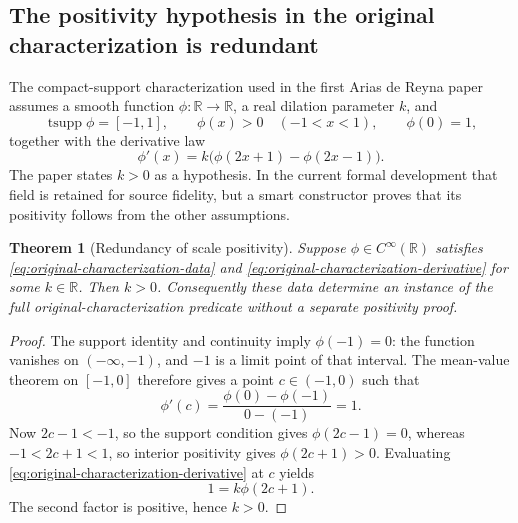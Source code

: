 \documentclass[11pt,oneside]{article}
\newtheorem{theorem}{Theorem}[section]
\theoremstyle{definition}
\theoremstyle{remark}
\newcommand{\R}{\mathbb R}
\begin{document}
\subsection{The positivity hypothesis in the original characterization is redundant}
\label{sec:scale-positive}

The compact-support characterization used in the first Arias de Reyna paper
\cite{arias05442} assumes a smooth function $\phi:\R\to\R$, a real dilation
parameter $k$, and
\begin{equation}
 \operatorname{tsupp}\phi=[-1,1],\qquad
 \phi(x)>0\quad(-1<x<1),\qquad
 \phi(0)=1,
 \label{eq:original-characterization-data}
\end{equation}
together with the derivative law
\begin{equation}
 \phi'(x)=k\bigl(\phi(2x+1)-\phi(2x-1)\bigr).
 \label{eq:original-characterization-derivative}
\end{equation}
The paper states $k>0$ as a hypothesis.  In the current formal development that field is retained
for source fidelity, but a smart constructor proves that its positivity follows from the other
assumptions.

\begin{theorem}[Redundancy of scale positivity]
\label{thm:scale-positive-redundant}
Suppose $\phi\in C^\infty(\R)$ satisfies
\eqref{eq:original-characterization-data} and
\eqref{eq:original-characterization-derivative} for some $k\in\R$.  Then $k>0$.
Consequently these data determine an instance of the full original-characterization predicate
without a separate positivity proof.
\end{theorem}

\begin{proof}
The support identity and continuity imply $\phi(-1)=0$: the function vanishes on
$(-\infty,-1)$, and $-1$ is a limit point of that interval.  The mean-value theorem on
$[-1,0]$ therefore gives a point $c\in(-1,0)$ such that
\begin{equation}
 \phi'(c)=\frac{\phi(0)-\phi(-1)}{0-(-1)}=1.
 \label{eq:original-characterization-mvt}
\end{equation}
Now $2c-1<-1$, so the support condition gives $\phi(2c-1)=0$, whereas
$-1<2c+1<1$, so interior positivity gives $\phi(2c+1)>0$.  Evaluating
\eqref{eq:original-characterization-derivative} at $c$ yields
\begin{equation}
 1=k\phi(2c+1).
 \label{eq:original-characterization-positive-product}
\end{equation}
The second factor is positive, hence $k>0$.
\end{proof}
\end{document}
